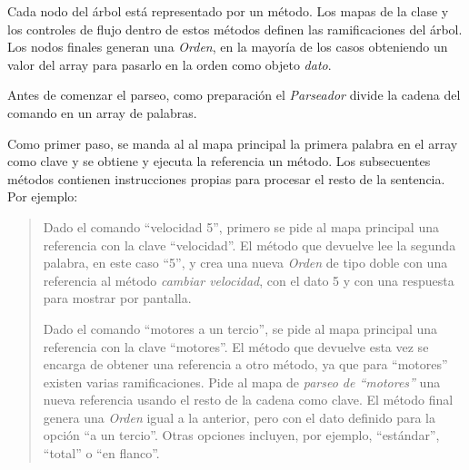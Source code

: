 \documentclass[a4paper,
	11pt,
	parskip=full,
	bibliography=totoc,
	twoside
	]{scrartcl}
\begin{document}
			Cada nodo del árbol está representado por un método. Los mapas de la clase y los controles de flujo dentro de estos métodos definen las ramificaciones del árbol. Los nodos finales generan una \textit{Orden}, en la mayoría de los casos obteniendo un valor del array para pasarlo en la orden como objeto \textit{dato}.
			
			Antes de comenzar el parseo, como preparación el \textit{Parseador} divide la cadena del comando en un array de palabras.
			
			Como primer paso, se manda al al mapa principal la primera palabra en el array como clave y se obtiene y ejecuta la referencia un método. Los subsecuentes métodos contienen instrucciones propias para procesar el resto de la sentencia. Por ejemplo:
			\begin{quote}
				Dado el comando ``velocidad 5'', primero se pide al mapa principal una referencia con la clave ``velocidad''. El método que devuelve lee la segunda palabra, en este caso ``5'', y crea una nueva \textit{Orden} de tipo doble con una referencia al método \textit{cambiar velocidad}, con el dato 5 y con una respuesta para mostrar por pantalla.
				
				Dado el comando ``motores a un tercio'', se pide al mapa principal una referencia con la clave ``motores''. El método que devuelve esta vez se encarga de obtener una referencia a otro método, ya que para ``motores'' existen varias ramificaciones. Pide al mapa de \textit{parseo de ``motores''} una nueva referencia usando el resto de la cadena como clave. El método final genera una \textit{Orden} igual a la anterior, pero con el dato definido para la opción ``a un tercio''. Otras opciones incluyen, por ejemplo, ``estándar'', ``total'' o ``en flanco''.
			\end{quote}
			
		\clearpage
\end{document}
